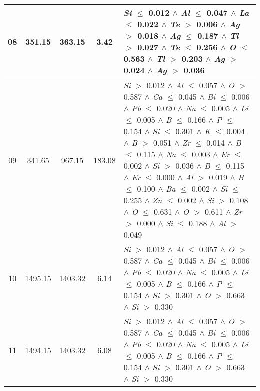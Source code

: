 \begin{table}[!htbp]
\begin{tabular}{ccccm{}}
		\hline
		08 & 351.15 & 363.15 & 3.42 & \textit{Si} $\le$ 0.012 $\wedge$ \textit{Al} $\le$ 0.047 $\wedge$ \textit{La} $\le$ 0.022 $\wedge$ \textit{Te} $>$ 0.006 $\wedge$ \textit{Ag} $>$ 0.018 $\wedge$ \textit{Ag} $\le$ 0.187 $\wedge$ \textit{Tl} $>$ 0.027 $\wedge$ \textit{Te} $\le$ 0.256 $\wedge$ \textit{O} $\le$ 0.563 $\wedge$ \textit{Tl} $>$ 0.203 $\wedge$ \textit{Ag} $>$ 0.024 $\wedge$ \textit{Ag} $>$ 0.036\\
		\hline
		09 & 341.65 & 967.15 & 183.08 & \textit{Si} $>$ 0.012 $\wedge$ \textit{Al} $\le$ 0.057 $\wedge$ \textit{O} $>$ 0.587 $\wedge$ \textit{Ca} $\le$ 0.045 $\wedge$ \textit{Bi} $\le$ 0.006 $\wedge$ \textit{Pb} $\le$ 0.020 $\wedge$ \textit{Na} $\le$ 0.005 $\wedge$ \textit{Li} $\le$ 0.005 $\wedge$ \textit{B} $\le$ 0.166 $\wedge$ \textit{P} $\le$ 0.154 $\wedge$ \textit{Si} $\le$ 0.301 $\wedge$ \textit{K} $\le$ 0.004 $\wedge$ \textit{B} $>$ 0.051 $\wedge$ \textit{Zr} $\le$ 0.014 $\wedge$ \textit{B} $\le$ 0.115 $\wedge$ \textit{Na} $\le$ 0.003 $\wedge$ \textit{Er} $\le$ 0.002 $\wedge$ \textit{Si} $>$ 0.036 $\wedge$ \textit{B} $\le$ 0.115 $\wedge$ \textit{Er} $\le$ 0.000 $\wedge$ \textit{Al} $>$ 0.019 $\wedge$ \textit{B} $\le$ 0.100 $\wedge$ \textit{Ba} $\le$ 0.002 $\wedge$ \textit{Si} $\le$ 0.255 $\wedge$ \textit{Zn} $\le$ 0.002 $\wedge$ \textit{Si} $>$ 0.108 $\wedge$ \textit{O} $\le$ 0.631 $\wedge$ \textit{O} $>$ 0.611 $\wedge$ \textit{Zr} $>$ 0.000 $\wedge$ \textit{Si} $\le$ 0.188 $\wedge$ \textit{Al} $>$ 0.049\\
		\hline
		10 & 1495.15 & 1403.32 & 6.14 & \textit{Si} $>$ 0.012 $\wedge$ \textit{Al} $\le$ 0.057 $\wedge$ \textit{O} $>$ 0.587 $\wedge$ \textit{Ca} $\le$ 0.045 $\wedge$ \textit{Bi} $\le$ 0.006 $\wedge$ \textit{Pb} $\le$ 0.020 $\wedge$ \textit{Na} $\le$ 0.005 $\wedge$ \textit{Li} $\le$ 0.005 $\wedge$ \textit{B} $\le$ 0.166 $\wedge$ \textit{P} $\le$ 0.154 $\wedge$ \textit{Si} $>$ 0.301 $\wedge$ \textit{O} $>$ 0.663 $\wedge$ \textit{Si} $>$ 0.330\\
		\hline
		11 & 1494.15 & 1403.32 & 6.08 & \textit{Si} $>$ 0.012 $\wedge$ \textit{Al} $\le$ 0.057 $\wedge$ \textit{O} $>$ 0.587 $\wedge$ \textit{Ca} $\le$ 0.045 $\wedge$ \textit{Bi} $\le$ 0.006 $\wedge$ \textit{Pb} $\le$ 0.020 $\wedge$ \textit{Na} $\le$ 0.005 $\wedge$ \textit{Li} $\le$ 0.005 $\wedge$ \textit{B} $\le$ 0.166 $\wedge$ \textit{P} $\le$ 0.154 $\wedge$ \textit{Si} $>$ 0.301 $\wedge$ \textit{O} $>$ 0.663 $\wedge$ \textit{Si} $>$ 0.330\\
		\bottomrule
	\end{tabular}
\end{table}
